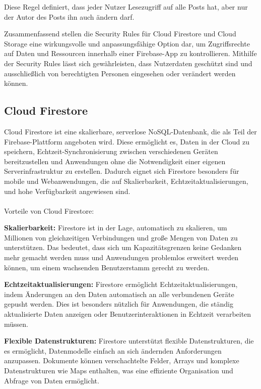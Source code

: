 Diese Regel definiert, dass jeder Nutzer Lesezugriff auf
alle Posts hat, aber nur der Autor des Posts ihn auch ändern
darf.

Zusammenfassend stellen die Security Rules für Cloud Firestore und Cloud Storage eine wirkungsvolle und anpassungsfähige Option dar, um Zugriffsrechte auf Daten und Ressourcen innerhalb einer Firebase-App zu kontrollieren. Mithilfe der Security Rules lässt sich gewährleisten, dass Nutzerdaten geschützt sind und ausschließlich von berechtigten Personen eingesehen oder verändert werden können.



\subsection{Cloud Firestore}
\author{Sandin Habibovic}

Cloud Firestore\cite{firestore} ist eine skalierbare, serverlose NoSQL-Datenbank, die als Teil der Firebase-Plattform angeboten wird. Diese ermöglicht es, Daten in der Cloud zu speichern, Echtzeit-Synchronisierung zwischen verschiedenen Geräten bereitzustellen und Anwendungen ohne die Notwendigkeit einer eigenen Serverinfrastruktur zu erstellen. Dadurch eignet sich Firestore besonders für mobile und Webanwendungen, die auf Skalierbarkeit, Echtzeitaktualisierungen, und hohe Verfügbarkeit angewiesen sind.
\\\\
Vorteile von Cloud Firestore:

\textbf{Skalierbarkeit:} Firestore ist in der Lage, automatisch zu skalieren, um Millionen von gleichzeitigen Verbindungen und große Mengen von Daten zu unterstützen. Das bedeutet, dass sich um Kapazitätsgrenzen keine Gedanken mehr gemacht werden muss und Anwendungen problemlos erweitert werden können, um einem wachsenden Benutzerstamm gerecht zu werden.

\textbf{Echtzeitaktualisierungen:} Firestore ermöglicht Echtzeitaktualisierungen, indem Änderungen an den Daten automatisch an alle verbundenen Geräte gepusht werden. Dies ist besonders nützlich für Anwendungen, die ständig aktualisierte Daten anzeigen oder Benutzerinteraktionen in Echtzeit verarbeiten müssen.

\textbf{Flexible Datenstrukturen:} Firestore unterstützt flexible Datenstrukturen, die es ermöglicht, Datenmodelle einfach an sich ändernden Anforderungen anzupassen. Dokumente können verschachtelte Felder, Arrays und komplexe Datenstrukturen wie Maps enthalten, was eine effiziente Organisation und Abfrage von Daten ermöglicht.

